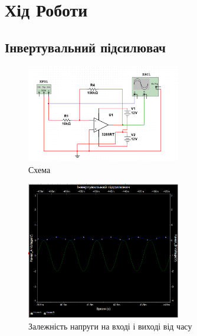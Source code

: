 \documentclass[
  ukrainian,
  14pt
]{extreport}
\begin{document}
\section{Хід Роботи}
\subsection{Інвертувальний підсилювач}
\begin{figure}[H]
    \includegraphics[width=0.6\textwidth]{imgs/1-1.png}
    \centering
    \caption{Схема}
\end{figure}
\begin{figure}[H]
    \includegraphics[width=0.6\textwidth]{imgs/1-2.png}
    \centering
    \caption{Залежність напруги на вході і виході від часу}
\end{figure}
\end{document}
